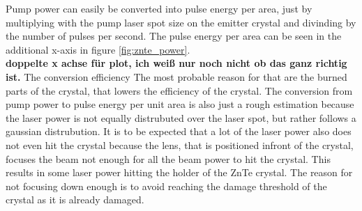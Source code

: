 Pump power can easily be converted into pulse energy per area, just by multiplying with the pump laser spot size on the emitter crystal and divinding by the number of pulses per second.
The pulse energy per area can be seen in the additional x-axis in figure \ref{fig:znte_power}.
\\
\textbf{doppelte x achse für plot, ich weiß nur noch nicht ob das ganz richtig ist.}
The conversion efficiency
The most probable reason for that are the burned parts of the crystal, that lowers the efficiency of the crystal.
The conversion from pump power to pulse energy per unit area is also just a rough estimation because the laser power is not equally distrubuted over the laser spot, but rather follows a gaussian distrubution.
It is to be expected that a lot of the laser power also does not even hit the crystal because the lens, that is positioned infront of the crystal, focuses the beam not enough for all the beam power to hit the crystal.
This results in some laser power hitting the holder of the ZnTe crystal.
The reason for not focusing down enough is to avoid reaching the damage threshold of the crystal as it is already damaged.
\FloatBarrier
